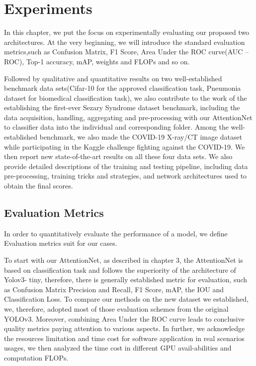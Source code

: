 































\chapter{Experiments}
\label{sec:examples}
In this chapter, we put the focus on experimentally evaluating our proposed two architectures. At the very beginning, we will introduce the standard evaluation metrics,such as Confusion Matrix, F1 Score, Area Under the ROC curve(AUC – ROC), Top-1 accuracy, mAP,  weights and FLOPs and so on. 

Followed by qualitative and quantitative results on two well-established benchmark data sets(Cifar-10 for the approved classification task, Pneumonia dataset for biomedical classification task), we also contribute to the work of the establishing the first-ever Sezary Syndrome dataset benchmark, including the data acquisition, handling, aggregating and pre-processing with our AttentionNet to classifier data into the individual and corresponding folder. Among the well-established benchmark, we also made the COVID-19 X-ray/CT image dataset while participating in the Kaggle challenge fighting against the COVID-19. We then report new state-of-the-art results on all these four data sets. We also provide detailed descriptions of the training and testing pipeline, including data pre-processing, training tricks and strategies, and network architectures used to obtain the final scores.

\section{Evaluation Metrics}
\label{sec:lorem}
In order to quantitatively evaluate the performance of a model, we define Evaluation metrics suit for our cases.

To start with our AttentionNet,  as described in chapter 3, the AttentionNet is based on classification task and follows the superiority of the architecture of Yolov3- tiny, therefore, there is generally established metric for evaluation, such as Confusion Matrix Precision and Recall, F1 Score, mAP,  the IOU and  Classification Loss. To compare our methods on the new dataset we established, we, therefore, adopted most of those evaluation schemes from the original YOLOv3. Moreover, combining Area Under the ROC curve leads to conclusive quality metrics paying attention to various aspects. 
In further, we acknowledge the resources limitation and time cost for software application in real scenarios usages, we then analyzed the time cost in different GPU avail-abilities and computation FLOPs.


